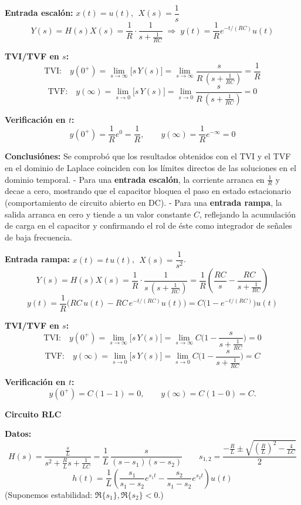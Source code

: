 \textbf{Entrada escalón:} \(x(t)=u(t)\), \(\;X(s)=\dfrac{1}{s}\)
\[
Y(s)=H(s)X(s)=\frac{1}{R}\cdot\frac{1}{s+\tfrac{1}{RC}}
\;\Rightarrow\;
y(t)=\frac{1}{R}e^{-t/(RC)}u(t)
\]

\textbf{TVI/TVF en \(s\):}
\[
\text{TVI:}\quad y(0^+)=\lim_{s\to\infty}\big[s\,Y(s)\big]
=\lim_{s\to\infty}\frac{s}{R\,(s+\tfrac{1}{RC})}=\frac{1}{R}
\]
\[
\text{TVF:}\quad y(\infty)=\lim_{s\to 0}\big[s\,Y(s)\big]
=\lim_{s\to 0}\frac{s}{R\,(s+\tfrac{1}{RC})}=0
\]

\textbf{Verificación en \(t\):}
\[
y(0^+)=\frac{1}{R}e^{0}= \frac{1}{R},\qquad
y(\infty)=\frac{1}{R}e^{-\infty}=0
\]

\textbf{Conclusiónes:}  
Se comprobó que los resultados obtenidos con el TVI y el TVF en el dominio de Laplace coinciden con los límites directos de las soluciones en el dominio temporal.  
- Para una \textbf{entrada escalón}, la corriente arranca en $\tfrac{1}{R}$ y decae a cero, mostrando que el capacitor bloquea el paso en estado estacionario (comportamiento de circuito abierto en DC).  
- Para una \textbf{entrada rampa}, la salida arranca en cero y tiende a un valor constante $C$, reflejando la acumulación de carga en el capacitor y confirmando el rol de éste como integrador de señales de baja frecuencia.  

\medskip

\textbf{Entrada rampa:} \(x(t)=t\,u(t)\), \(\;X(s)=\dfrac{1}{s^2}\).
\[
Y(s)=H(s)X(s)=\frac{1}{R}\cdot\frac{1}{s\,(s+\tfrac{1}{RC})}
=\frac{1}{R}\!\left(\frac{RC}{s}-\frac{RC}{s+\tfrac{1}{RC}}\right)
\]
\[
y(t)=\frac{1}{R}\big(RC\,u(t)-RC\,e^{-t/(RC)}u(t)\big)
= C\big(1-e^{-t/(RC)}\big)u(t)
\]

\textbf{TVI/TVF en \(s\):}
\[
\text{TVI:}\quad y(0^+)=\lim_{s\to\infty}\big[s\,Y(s)\big]
=\lim_{s\to\infty} C\Big(1-\frac{s}{s+\tfrac{1}{RC}}\Big)=0
\]
\[
\text{TVF:}\quad y(\infty)=\lim_{s\to 0}\big[s\,Y(s)\big]
=\lim_{s\to 0} C\Big(1-\frac{s}{s+\tfrac{1}{RC}}\Big)=C
\]

\textbf{Verificación en \(t\):}
\[
y(0^+)=C(1-1)=0,\qquad y(\infty)=C(1-0)=C.
\]


\textbf{Circuito RLC}

\textbf{Datos:}
\[
H(s)=\frac{\tfrac{s}{L}}{s^2+\tfrac{R}{L}s+\tfrac{1}{LC}}
=\frac{1}{L}\,\frac{s}{(s-s_1)(s-s_2)}\qquad
s_{1,2}=\frac{-\tfrac{R}{L}\pm\sqrt{\left(\tfrac{R}{L}\right)^2-\tfrac{4}{LC}}}{2}
\]
\[
h(t)=\frac{1}{L}\left(\frac{s_1}{s_1-s_2}e^{s_1 t}
-\frac{s_2}{s_1-s_2}e^{s_2 t}\right)u(t)
\]
(Suponemos estabilidad: \(\Re\{s_1\},\Re\{s_2\}<0\).)

